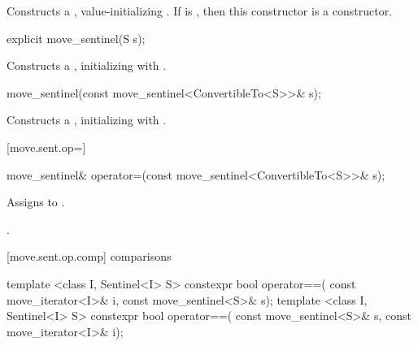 \begin{itemdescr}
\pnum
\effects Constructs a , value-initializing
. If  is , then this constructor
is a  constructor.
\end{itemdescr}

%
\begin{itemdecl}
explicit move_sentinel(S s);
\end{itemdecl}

\begin{itemdescr}
\pnum
\effects Constructs a , initializing
 with .
\end{itemdescr}

%
\begin{itemdecl}
move_sentinel(const move_sentinel<ConvertibleTo<S>>& s);
\end{itemdecl}

\begin{itemdescr}
\pnum
\effects Constructs a , initializing
 with .
\end{itemdescr}

[move.sent.op=]{}

%
%
\begin{itemdecl}
move_sentinel& operator=(const move_sentinel<ConvertibleTo<S>>& s);
\end{itemdecl}

\begin{itemdescr}
\pnum
\effects Assigns  to .

\pnum
\returns {}.
\end{itemdescr}

[move.sent.op.comp]{ comparisons}

%
%
\begin{itemdecl}
template <class I, Sentinel<I> S>
  constexpr bool operator==(
    const move_iterator<I>& i, const move_sentinel<S>& s);
template <class I, Sentinel<I> S>
  constexpr bool operator==(
    const move_sentinel<S>& s, const move_iterator<I>& i);
\end{itemdecl}

